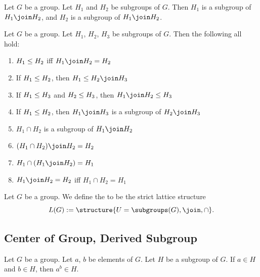 \begin{theorem}
Let $G$ be a group.
Let $H_{1}$ and $H_{2}$ be subgroups of $G$.
Then $H_{1}$ is a subgroup of $H_{1}\join H_{2}$,
and $H_{2}$ is a subgroup of $H_{1}\join H_{2}$.
\end{theorem}

\begin{theorem}
Let $G$ be a group.
Let $H_{1}$, $H_{2}$, $H_{3}$ be subgroups of $G$.
Then the following all hold:
\begin{enumerate}
\item{} $H_{1}\leq H_{2}$ iff $H_{1}\join H_{2}=H_{2}$
\item{} If $H_{1}\leq H_{2}$, then $H_{1}\subgroup H_{2}\join H_{3}$
\item{} If $H_{1}\leq H_{3}$ and $H_{2}\leq H_{3}$,
  then $H_{1}\join H_{2}\subgroup H_{3}$
\item{} If $H_{1}\leq H_{2}$, then $H_{1}\join H_{3}$
  is a subgroup of $H_{2}\join H_{3}$
\item{} $H_{1}\cap H_{2}$ is a subgroup of $H_{1}\join H_{2}$
\item{} $(H_{1}\cap H_{2})\join H_{2}=H_{2}$
\item{} $H_{1}\cap(H_{1}\join H_{2})=H_{1}$
\item{} $H_{1}\join H_{2}=H_{2}$ iff $H_{1}\cap H_{2}=H_{1}$
\end{enumerate}
\end{theorem}

\begin{definition}
Let $G$ be a group. We define the  to be
the strict lattice structure
$$L(G):=\structure{U=\subgroups(G), \join, \cap}.$$
\end{definition}

\subsection{Center of Group, Derived Subgroup}

\begin{theorem}
Let $G$ be a group.
Let $a$, $b$ be elements of $G$.
Let $H$ be a subgroup of $G$.
If $a\in H$ and $b\in H$, then $a^{b}\in H$.
\end{theorem}


